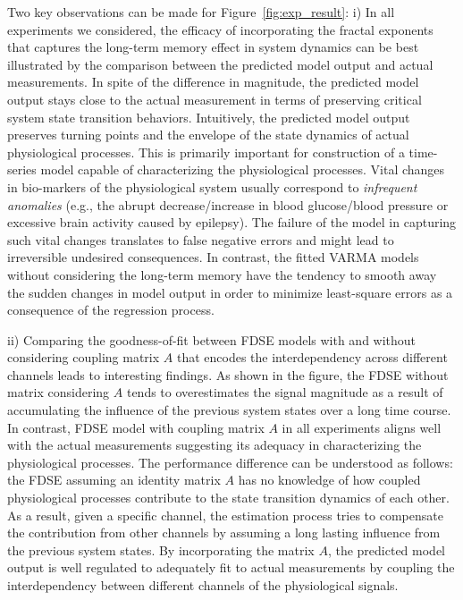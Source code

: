  Two key observations can be made for Figure~\ref{fig:exp_result}: i) In all experiments we considered, the efficacy of incorporating the fractal exponents that captures the long-term memory effect in system dynamics can be best illustrated by the comparison between the predicted model output and actual measurements. In spite of the difference in magnitude, the predicted model output stays close to the actual measurement in terms of preserving critical system state transition behaviors. Intuitively, the predicted model output preserves turning points and the envelope of the state dynamics of actual physiological processes. This is primarily important for construction of a time-series model capable of characterizing the physiological processes. Vital changes in bio-markers of the physiological system usually correspond to \textit{infrequent anomalies} (e.g., the abrupt decrease/increase in blood glucose/blood pressure or excessive brain activity caused by epilepsy). The failure of the model in capturing such vital changes translates to false negative errors and might lead to irreversible undesired consequences. In contrast, the fitted VARMA models without considering the long-term memory have the tendency to smooth away the sudden changes in model output in order to minimize least-square errors as a consequence of the regression process.
 
 ii) Comparing the goodness-of-fit between FDSE models with and without considering coupling matrix $A$ that encodes the interdependency across different channels leads to interesting findings. As shown in the figure, the FDSE without matrix considering $A$ tends to overestimates the signal magnitude as a result of accumulating the influence of the previous system states over a long time course. In contrast, FDSE model with coupling matrix $A$ in all experiments aligns well with the actual measurements suggesting its adequacy in characterizing the physiological processes. The performance difference can be understood as follows: the FDSE assuming an identity matrix $A$ has no knowledge of how coupled physiological processes contribute to the state transition dynamics of each other. As a result, given a specific channel, the estimation process tries to compensate the contribution from other channels by assuming a long lasting influence from the previous system states. By incorporating the matrix $A$, the predicted model output is well regulated to adequately fit to actual measurements by coupling the interdependency between different channels of the physiological signals.
